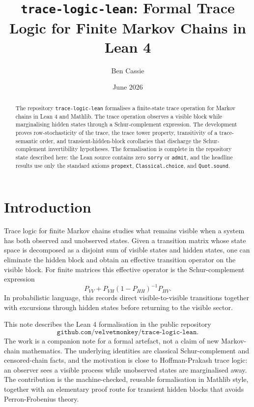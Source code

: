 \documentclass[11pt]{article}
\title{\texttt{trace-logic-lean}: Formal Trace Logic for Finite Markov Chains in Lean 4}
\author{Ben Cassie}
\date{June 2026}
\begin{document}
\maketitle

\begin{abstract}
The repository \texttt{trace-logic-lean} formalises a finite-state trace operation for Markov chains in Lean 4 and Mathlib.
The trace operation observes a visible block while marginalising hidden states through a Schur-complement expression.
The development proves row-stochasticity of the trace, the trace tower property, transitivity of a trace-semantic order, and transient-hidden-block corollaries that discharge the Schur-complement invertibility hypotheses.
The formalisation is complete in the repository state described here: the Lean source contains zero \texttt{sorry} or \texttt{admit}, and the headline results use only the standard axioms \texttt{propext}, \texttt{Classical.choice}, and \texttt{Quot.sound}.
\end{abstract}

\section{Introduction}

Trace logic for finite Markov chains studies what remains visible when a system has both observed and unobserved states.
Given a transition matrix whose state space is decomposed as a disjoint sum of visible states and hidden states, one can eliminate the hidden block and obtain an effective transition operator on the visible block.
For finite matrices this effective operator is the Schur-complement expression
\[
  P_{VV} + P_{VH}(1-P_{HH})^{-1}P_{HV}.
\]
In probabilistic language, this records direct visible-to-visible transitions together with excursions through hidden states before returning to the visible sector.

This note describes the Lean 4 formalisation in the public repository
\[
  \texttt{github.com/velvetmonkey/trace-logic-lean}.
\]
The work is a companion note for a formal artefact, not a claim of new Markov-chain mathematics.
The underlying identities are classical Schur-complement and censored-chain facts, and the motivation is close to Hoffman-Prakash trace logic: an observer sees a visible process while unobserved states are marginalised away.
The contribution is the machine-checked, reusable formalisation in Mathlib style, together with an elementary proof route for transient hidden blocks that avoids Perron-Frobenius theory.
\end{document}
